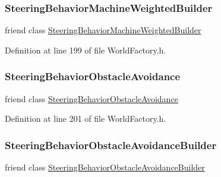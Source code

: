 \subsubsection{\texorpdfstring{Steering\+Behavior\+Machine\+Weighted\+Builder}{SteeringBehaviorMachineWeightedBuilder}}
{\footnotesize\ttfamily friend class \mbox{\hyperlink{classnjli_1_1_steering_behavior_machine_weighted_builder}{Steering\+Behavior\+Machine\+Weighted\+Builder}}\hspace{0.3cm}{\ttfamily [friend]}}



Definition at line 199 of file World\+Factory.\+h.

\mbox{\label{classnjli_1_1_world_factory_a1da7ab3cfd5a6711ca76774954b3a096}} 
\subsubsection{\texorpdfstring{Steering\+Behavior\+Obstacle\+Avoidance}{SteeringBehaviorObstacleAvoidance}}
{\footnotesize\ttfamily friend class \mbox{\hyperlink{classnjli_1_1_steering_behavior_obstacle_avoidance}{Steering\+Behavior\+Obstacle\+Avoidance}}\hspace{0.3cm}{\ttfamily [friend]}}



Definition at line 201 of file World\+Factory.\+h.

\mbox{\label{classnjli_1_1_world_factory_ad8731e644336210104f9631702ea93d0}} 
\subsubsection{\texorpdfstring{Steering\+Behavior\+Obstacle\+Avoidance\+Builder}{SteeringBehaviorObstacleAvoidanceBuilder}}
{\footnotesize\ttfamily friend class \mbox{\hyperlink{classnjli_1_1_steering_behavior_obstacle_avoidance_builder}{Steering\+Behavior\+Obstacle\+Avoidance\+Builder}}\hspace{0.3cm}{\ttfamily [friend]}}



